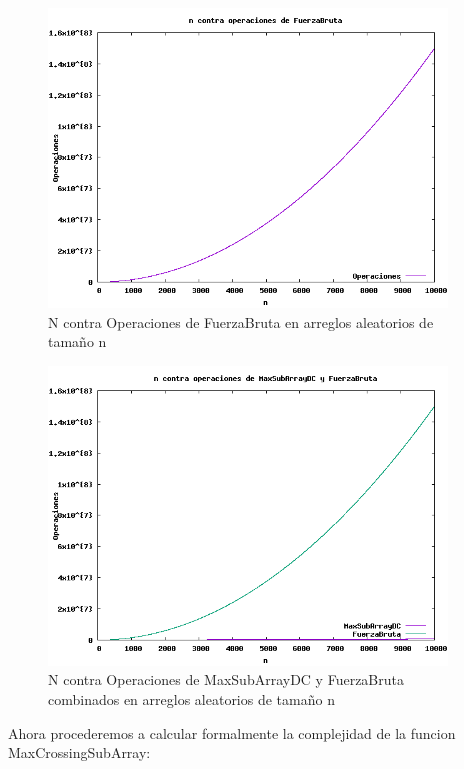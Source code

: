\documentclass[spanish]{article}
\begin{document}
	\begin{figure}[H]
		\centering
		\includegraphics[width=400px,height=300px]{grafica10}
		\caption{N contra Operaciones de FuerzaBruta en arreglos aleatorios de tamaño n}
	\end{figure}
	\begin{figure}[H]
		\centering
		\includegraphics[width=400px,height=300px]{grafica11}
		\caption{N contra Operaciones de MaxSubArrayDC y FuerzaBruta combinados en arreglos aleatorios de tamaño n}
	\end{figure}
	Ahora procederemos a calcular formalmente la complejidad de la funcion MaxCrossingSubArray:
\end{document}
